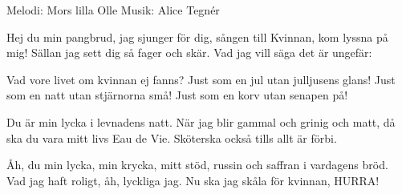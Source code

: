 \begin{song}

\begin{songmeta}
Melodi: Mors lilla Olle
Musik: Alice Tegnér
\end{songmeta}

\begin{songtext}
Hej du min pangbrud, jag sjunger för dig,
sången till Kvinnan, kom lyssna på mig!
Sällan jag sett dig så fager och skär.
Vad jag vill säga det är ungefär:

Vad vore livet om kvinnan ej fanns?
Just som en jul utan julljusens glans!
Just som en natt utan stjärnorna små!
Just som en korv utan senapen på!

Du är min lycka i levnadens natt.
När jag blir gammal och grinig och matt,
då ska du vara mitt livs Eau de Vie.
Sköterska också tills allt är förbi.

Åh, du min lycka, min krycka, mitt stöd,
russin och saffran i vardagens bröd.
Vad jag haft roligt, åh, lyckliga jag.
Nu ska jag skåla för kvinnan, HURRA!
\end{songtext}
\end{song}
